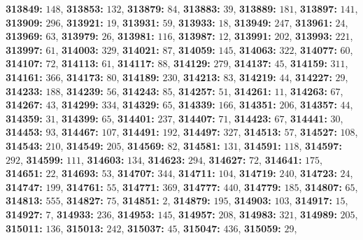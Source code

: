 \textsf{\bfseries 313849:} $148$, \textsf{\bfseries 313853:} $132$, \textsf{\bfseries 313879:} $84$, \textsf{\bfseries 313883:} $39$, \textsf{\bfseries 313889:} $181$, \textsf{\bfseries 313897:} $141$, \textsf{\bfseries 313909:} $296$, \textsf{\bfseries 313921:} $19$, \textsf{\bfseries 313931:} $59$, \textsf{\bfseries 313933:} $18$, \textsf{\bfseries 313949:} $247$, \textsf{\bfseries 313961:} $24$, \textsf{\bfseries 313969:} $63$, \textsf{\bfseries 313979:} $26$, \textsf{\bfseries 313981:} $116$, \textsf{\bfseries 313987:} $12$, \textsf{\bfseries 313991:} $202$, \textsf{\bfseries 313993:} $221$, \textsf{\bfseries 313997:} $61$, \textsf{\bfseries 314003:} $329$, \textsf{\bfseries 314021:} $87$, \textsf{\bfseries 314059:} $145$, \textsf{\bfseries 314063:} $322$, \textsf{\bfseries 314077:} $60$, \textsf{\bfseries 314107:} $72$, \textsf{\bfseries 314113:} $61$, \textsf{\bfseries 314117:} $88$, \textsf{\bfseries 314129:} $279$, \textsf{\bfseries 314137:} $45$, \textsf{\bfseries 314159:} $311$, \textsf{\bfseries 314161:} $366$, \textsf{\bfseries 314173:} $80$, \textsf{\bfseries 314189:} $230$, \textsf{\bfseries 314213:} $83$, \textsf{\bfseries 314219:} $44$, \textsf{\bfseries 314227:} $29$, \textsf{\bfseries 314233:} $188$, \textsf{\bfseries 314239:} $56$, \textsf{\bfseries 314243:} $85$, \textsf{\bfseries 314257:} $51$, \textsf{\bfseries 314261:} $11$, \textsf{\bfseries 314263:} $67$, \textsf{\bfseries 314267:} $43$, \textsf{\bfseries 314299:} $334$, \textsf{\bfseries 314329:} $65$, \textsf{\bfseries 314339:} $166$, \textsf{\bfseries 314351:} $206$, \textsf{\bfseries 314357:} $44$, \textsf{\bfseries 314359:} $31$, \textsf{\bfseries 314399:} $65$, \textsf{\bfseries 314401:} $237$, \textsf{\bfseries 314407:} $71$, \textsf{\bfseries 314423:} $67$, \textsf{\bfseries 314441:} $30$, \textsf{\bfseries 314453:} $93$, \textsf{\bfseries 314467:} $107$, \textsf{\bfseries 314491:} $192$, \textsf{\bfseries 314497:} $327$, \textsf{\bfseries 314513:} $57$, \textsf{\bfseries 314527:} $108$, \textsf{\bfseries 314543:} $210$, \textsf{\bfseries 314549:} $205$, \textsf{\bfseries 314569:} $82$, \textsf{\bfseries 314581:} $131$, \textsf{\bfseries 314591:} $118$, \textsf{\bfseries 314597:} $292$, \textsf{\bfseries 314599:} $111$, \textsf{\bfseries 314603:} $134$, \textsf{\bfseries 314623:} $294$, \textsf{\bfseries 314627:} $72$, \textsf{\bfseries 314641:} $175$, \textsf{\bfseries 314651:} $22$, \textsf{\bfseries 314693:} $53$, \textsf{\bfseries 314707:} $344$, \textsf{\bfseries 314711:} $104$, \textsf{\bfseries 314719:} $240$, \textsf{\bfseries 314723:} $24$, \textsf{\bfseries 314747:} $199$, \textsf{\bfseries 314761:} $55$, \textsf{\bfseries 314771:} $369$, \textsf{\bfseries 314777:} $440$, \textsf{\bfseries 314779:} $185$, \textsf{\bfseries 314807:} $65$, \textsf{\bfseries 314813:} $555$, \textsf{\bfseries 314827:} $75$, \textsf{\bfseries 314851:} $2$, \textsf{\bfseries 314879:} $195$, \textsf{\bfseries 314903:} $103$, \textsf{\bfseries 314917:} $15$, \textsf{\bfseries 314927:} $7$, \textsf{\bfseries 314933:} $236$, \textsf{\bfseries 314953:} $145$, \textsf{\bfseries 314957:} $208$, \textsf{\bfseries 314983:} $321$, \textsf{\bfseries 314989:} $205$, \textsf{\bfseries 315011:} $136$, \textsf{\bfseries 315013:} $242$, \textsf{\bfseries 315037:} $45$, \textsf{\bfseries 315047:} $436$, \textsf{\bfseries 315059:} $29$, 
